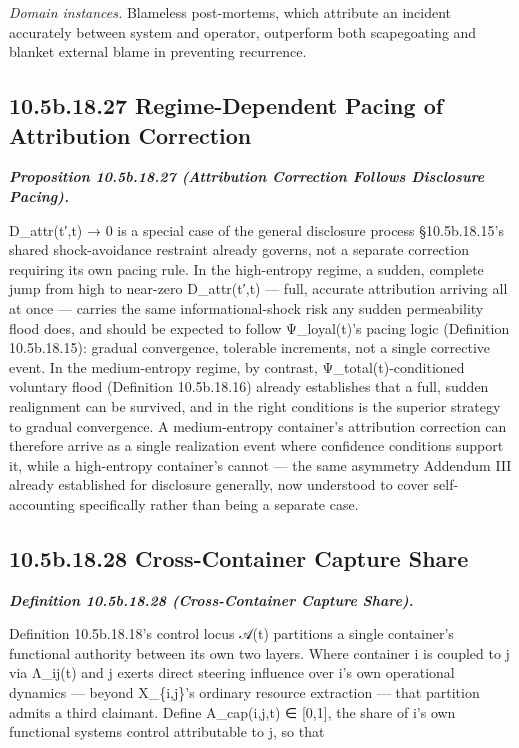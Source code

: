 \documentclass[
]{article}
\begin{document}
\emph{Domain instances.} Blameless post-mortems, which attribute an
incident accurately between system and operator, outperform both
scapegoating and blanket external blame in preventing recurrence.

\hypertarget{b.18.27-regime-dependent-pacing-of-attribution-correction}{%
\subsection{10.5b.18.27 Regime-Dependent Pacing of Attribution
Correction}\label{b.18.27-regime-dependent-pacing-of-attribution-correction}}

\emph{\textbf{Proposition 10.5b.18.27 (Attribution Correction Follows
Disclosure Pacing).}}

D\_attr(t′,t) → 0 is a special case of the general disclosure process
§10.5b.18.15's shared shock-avoidance restraint already governs, not a
separate correction requiring its own pacing rule. In the high-entropy
regime, a sudden, complete jump from high to near-zero D\_attr(t′,t) ---
full, accurate attribution arriving all at once --- carries the same
informational-shock risk any sudden permeability flood does, and should
be expected to follow Ψ\_loyal(t)'s pacing logic (Definition
10.5b.18.15): gradual convergence, tolerable increments, not a single
corrective event. In the medium-entropy regime, by contrast,
Ψ\_total(t)-conditioned voluntary flood (Definition 10.5b.18.16) already
establishes that a full, sudden realignment can be survived, and in the
right conditions is the superior strategy to gradual convergence. A
medium-entropy container's attribution correction can therefore arrive
as a single realization event where confidence conditions support it,
while a high-entropy container's cannot --- the same asymmetry Addendum
III already established for disclosure generally, now understood to
cover self-accounting specifically rather than being a separate case.

\hypertarget{b.18.28-cross-container-capture-share}{%
\subsection{10.5b.18.28 Cross-Container Capture
Share}\label{b.18.28-cross-container-capture-share}}

\emph{\textbf{Definition 10.5b.18.28 (Cross-Container Capture Share).}}

Definition 10.5b.18.18's control locus 𝒜(t) partitions a single
container's functional authority between its own two layers. Where
container i is coupled to j via Λ\_ij(t) and j exerts direct steering
influence over i's own operational dynamics --- beyond X\_\{i,j\}'s
ordinary resource extraction --- that partition admits a third claimant.
Define A\_cap(i,j,t) ∈ {[}0,1{]}, the share of i's own functional
systems control attributable to j, so that
\end{document}
